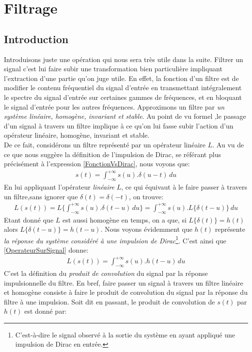 \section{Filtrage}
\subsection{Introduction}\label{Convol}
Introduisons juste une opération qui nous sera très utile dans la suite.
Filtrer un signal c'est lui faire subir une transformation bien particulière impliquant l'extraction d'une partie qu'on juge utile. En effet, la fonction d'un filtre est de modifier le contenu fréquentiel du signal d'entrée en transmettant intégralement le spectre du signal d'entrée sur certaines gammes de fréquences, et en bloquant le signal d'entrée pour les autres fréquences.  Approximons un filtre par \textit{\emph{un système} linéaire, homogène, invariant et stable}\cite{TraitSignMath}. Au point de vu formel ,le passage d'un signal à travers un filtre implique à ce qu'on lui fasse subir l'action d'un opérateur linéaire, homogène, invariant et stable.\\
De ce fait, considérons un filtre représenté par un opérateur linéaire $ L $. Au vu de ce que nous suggère la définition de l'impulsion de Dirac, se référant plus précisément à l'expression \ref{FonctionVsDirac}, nous voyons que:
\begin{eqnarray}
s(t) = \int_{-\infty}^{+\infty}s(u).\delta(u-t)\,du
\end{eqnarray}
En lui appliquant l'opérateur \emph{linéaire} $ L $, ce qui équivaut à le faire passer à travers un filtre,sans ignorer que $ \delta(t) = \delta(-t) $, on trouve:
\begin{eqnarray}\label{OperateurSurSignal}
L(s(t)) = L\{ \int_{-\infty}^{+\infty}s(u).\delta(t-u)\,du \} = \int_{-\infty}^{+\infty}s(u).L\{\delta(t-u)\}\,du
\end{eqnarray}
Etant donné que $ L $ est aussi homogène en temps, on a que, si $ L\{\delta(t)\} = h(t) $ alors $ L\{\delta(t-u)\} = h(t-u) $. Nous voyons évidemment que $ h(t) $ représente \emph{la réponse du système considéré à une impulsion de Dirac}\footnote{C'est-à-dire le signal observé à la sortie du système en ayant appliqué une impulsion de Dirac en entrée.}. C'est ainsi que \ref{OperateurSurSignal} donne:
\begin{eqnarray}
L(s(t)) = \int_{-\infty}^{+\infty}s(u).h(t-u)\,du
\end{eqnarray}\newpage
C'est la définition du \emph{produit de convolution} du signal par la réponse impulsionnelle du filtre. En bref, faire passer un signal à travers un filtre linéaire et homogène consiste à faire le produit de convolution du signal par la réponse du filtre à une impulsion. Soit dit en passant, le produit de convolution de $ s(t) $ par $ h(t) $ est donné par:

